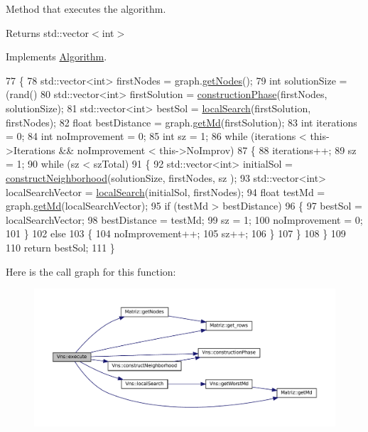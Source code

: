 Method that executes the algorithm. 

\begin{DoxyReturn}{Returns}
std\+::vector$<$int$>$ 
\end{DoxyReturn}


Implements \hyperlink{classAlgorithm_af6ea9eb9a6dbd41896e3fd7dabac096b}{Algorithm}.


\begin{DoxyCode}
77 \{
78   std::vector<int> firstNodes = graph.\hyperlink{classMatriz_a394b84a5ec13fd2f4d202ab218680afe}{getNodes}();
79   \textcolor{keywordtype}{int} solutionSize = (rand() %
80   std::vector<int> firstSolution = \hyperlink{classVns_aefd9719db68183a6b2ec871c86226ee4}{constructionPhase}(firstNodes, solutionSize);
81   std::vector<int> bestSol = \hyperlink{classVns_aea2dfebed6019c61f7b7405e198d50ab}{localSearch}(firstSolution, firstNodes);
82   \textcolor{keywordtype}{float} bestDistance = graph.\hyperlink{classMatriz_a8df14a27d791f24206dd633b2a685c5b}{getMd}(firstSolution);
83   \textcolor{keywordtype}{int} iterations = 0;
84   \textcolor{keywordtype}{int} noImprovement = 0;
85   \textcolor{keywordtype}{int} sz = 1;
86   \textcolor{keywordflow}{while} (iterations < this->Iterations && noImprovement < this->NoImprov)
87   \{
88     iterations++;
89     sz = 1;
90     \textcolor{keywordflow}{while} (sz < szTotal)
91     \{
92       std::vector<int> initialSol = \hyperlink{classVns_a8eee9f0e31bb41bcd7bd00c46170e5b9}{constructNeighborhood}(solutionSize, firstNodes, sz
      );
93       std::vector<int> localSearchVector = \hyperlink{classVns_aea2dfebed6019c61f7b7405e198d50ab}{localSearch}(initialSol, firstNodes);
94       \textcolor{keywordtype}{float} testMd = graph.\hyperlink{classMatriz_a8df14a27d791f24206dd633b2a685c5b}{getMd}(localSearchVector);
95       \textcolor{keywordflow}{if} (testMd > bestDistance)
96       \{
97         bestSol = localSearchVector;
98         bestDistance = testMd;
99         sz = 1;
100         noImprovement = 0;
101       \}
102       \textcolor{keywordflow}{else}
103       \{
104         noImprovement++;
105         sz++;
106       \}
107     \}
108   \}
109 
110   \textcolor{keywordflow}{return} bestSol;
111 \}
\end{DoxyCode}
Here is the call graph for this function\+:
\nopagebreak
\begin{figure}[H]
\begin{center}
\leavevmode
\includegraphics[width=350pt]{classVns_aece2ea2cb74dd3608570321fcbb2de0c_cgraph}
\end{center}
\end{figure}
